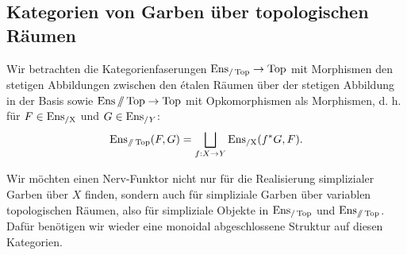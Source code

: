 \subsection{Kategorien von Garben über topologischen Räumen}

Wir betrachten die Kategorienfaserungen $\operatorname{Ens}_{/\operatorname{Top}} \to \operatorname{Top}$ mit
Morphismen den stetigen Abbildungen zwischen den étalen Räumen über
der stetigen Abbildung in der Basis sowie $\operatorname{Ens}{\mathbin{/\mkern-6mu/} \operatorname{Top}} \to
\operatorname{Top}$ mit Opkomorphismen als Morphismen, d. h. für $F \in \operatorname{Ens_{/X}}$ und
$G \in \operatorname{Ens}_{/Y}$:
\[ \operatorname{Ens}_{\mathbin{/\mkern-6mu/} \operatorname{Top}}(F, G) = \bigsqcup_{f: X \to Y} \operatorname{Ens_{/X}}(f^* G, F). \]

Wir möchten einen Nerv-Funktor nicht nur für die Realisierung
simplizialer Garben über $X$ finden, sondern auch für simpliziale
Garben über variablen topologischen Räumen, also für simpliziale
Objekte in $\operatorname{Ens}_{/\operatorname{Top}}$ und $\operatorname{Ens}_{\mathbin{/\mkern-6mu/} \operatorname{Top}}$. Dafür benötigen
wir wieder eine monoidal abgeschlossene Struktur auf diesen
Kategorien.

